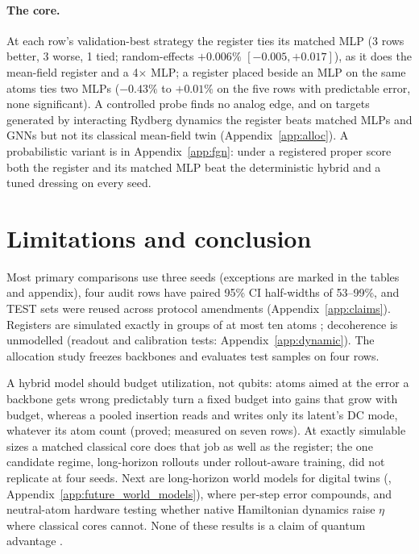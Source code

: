 \documentclass{article}
\newcommand{\AllocQvM}{3 rows better, 3 worse, 1 tied; random-effects $+0.006\%$ $[-0.005, +0.017]$}
\newcommand{\AllocPair}{$-0.43\%$ to $+0.01\%$ on the five rows with predictable error, none significant}
\begin{document}
\paragraph{The core.} At each row's validation-best strategy the register ties its matched MLP (\AllocQvM), as it does
the mean-field register and a 4$\times$ MLP; a register placed beside an MLP on the same atoms ties two MLPs
(\AllocPair). A controlled probe finds no analog edge, and on targets generated by interacting Rydberg dynamics the register beats
matched MLPs and GNNs but not its classical mean-field twin (Appendix~\ref{app:alloc}). A probabilistic variant is in Appendix~\ref{app:fgn}: under a registered proper score both the register and its matched MLP beat the deterministic hybrid and a tuned dressing on every seed.

\section{Limitations and conclusion}
\label{sec:limitations}

Most primary comparisons use three seeds (exceptions are marked in the tables and appendix), four audit rows have paired 95\% CI half-widths of 53--99\%, and TEST sets were reused across protocol amendments (Appendix~\ref{app:claims}).
Registers are simulated exactly in groups of at most ten atoms \citep{liu2025qpa}; decoherence is unmodelled (readout and calibration tests: Appendix~\ref{app:dynamic}). The allocation study freezes backbones and evaluates test samples on four rows.

A hybrid model should budget utilization, not qubits:
atoms aimed at the error a backbone gets wrong predictably turn a fixed budget into gains that grow with budget, whereas
a pooled insertion reads and writes only its latent's DC mode, whatever its atom count (proved; measured on seven rows). At exactly simulable sizes a matched classical core does that job as well as the register; the one candidate regime,
long-horizon rollouts under rollout-aware training, did not replicate at four seeds. Next are long-horizon world models for digital twins (\citealp{li2025worldmodelbench},
Appendix~\ref{app:future_world_models}), where per-step error compounds, and neutral-atom hardware testing whether
native Hamiltonian dynamics raise $\eta$ where classical cores cannot. None of these results is a claim of quantum advantage \citep{schuld2022advantage,cerezo2025barren}.

\clearpage
\end{document}
